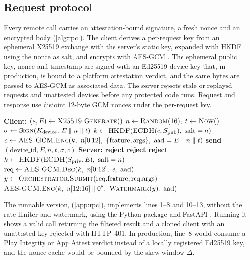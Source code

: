 \subsection{Request protocol}
Every remote call carries an attestation-bound signature, a fresh nonce and an encrypted
body (\cref{alg:rpc}). The client derives a per-request key from an ephemeral X25519
exchange \cite{bernstein2006curve25519,rfc7748} with the server's static key, expanded with
HKDF \cite{rfc5869} using the nonce as salt, and encrypts with AES-GCM \cite{nist80038d}.
The ephemeral public key, nonce and timestamp are signed with an Ed25519 device key
\cite{bernstein2012ed25519,rfc8032} that, in production, is bound to a platform attestation
verdict, and the same bytes are passed to AES-GCM as associated data. The server rejects
stale or replayed requests and unattested devices before any protected code runs. Request
and response use disjoint 12-byte GCM nonces under the per-request key.

\begin{algorithm}[htbp]
\caption{Attested invocation of a cloud-only feature}\label{alg:rpc}
\small
\begin{algorithmic}[1]
\Statex \textbf{Client:}
\State \((e, E) \gets \textsc{X25519.Generate}()\)
\State \(n \gets \textsc{Random}(16)\); \(t \gets \textsc{Now}()\)
\State \(\sigma \gets \textsc{Sign}(K_{\text{device}},\, E \parallel n \parallel t)\) 
\State \(k \gets \Kw{HKDF}(\Kw{ECDH}(e, S_{\text{pub}}),\ \text{salt}=n)\)
\State \(c \gets \Kw{AES-GCM.Enc}(k,\ n[0{:}12],\ \{\text{feature}, \text{args}\},\ \text{aad}=E \parallel n \parallel t)\)
\State \textbf{send} \((\text{device\_id}, E, n, t, \sigma, c)\)
\Statex \textbf{Server:}
 \textbf{reject} \EndIf
{} \textbf{reject} \EndIf
{} \textbf{reject}  \EndIf
\State \(k \gets \textsc{HKDF}(\textsc{ECDH}(S_{\text{priv}}, E),\ \text{salt}=n)\)
\State \(\text{req} \gets \Kw{AES-GCM.Dec}(k,\ n[0{:}12],\ c,\ \text{aad})\)
\State \(y \gets \textsc{Orchestrator.Submit}(\text{req.feature}, \text{req.args})\) 
\State \Return \(\textsc{AES-GCM.Enc}(k,\ n[12{:}16] \parallel 0^{8},\ \textsc{Watermark}(y),\ \text{aad})\)
\end{algorithmic}
\end{algorithm}

The runnable version,  (\cref{app:rpc}), implements lines 1--8 and
10--13, without the rate limiter and watermark, using the Python  package
\cite{pyca_cryptography} and FastAPI \cite{fastapi}. Running it shows a valid call returning
the filtered result and a cloned client with an unattested key rejected with HTTP~401. In
production, line~8 would consume a Play Integrity or App Attest verdict
\cite{google_playintegrity,apple_appattest} instead of a locally registered Ed25519 key, and
the nonce cache would be bounded by the skew window \(\Delta\).
